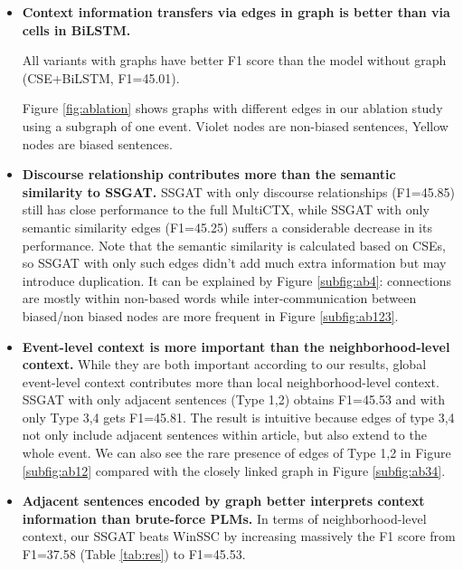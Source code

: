 \begin{itemize}
    \item \textbf{Context information transfers via edges in graph is better than via cells in BiLSTM. }
    
    All variants with graphs have better F1 score than the model without graph (CSE+BiLSTM, F1=45.01). 
    
    Figure \ref{fig:ablation} shows graphs with different edges in our ablation study using a subgraph of one event. {Violet nodes} are non-biased sentences, {Yellow nodes} are biased sentences.
    
    \item \textbf{Discourse relationship contributes more than the semantic similarity to SSGAT.} SSGAT with only discourse relationships (F1=45.85) still has close performance to the full MultiCTX, while SSGAT with only semantic similarity edges (F1=45.25) suffers a considerable decrease in its performance. Note that the semantic similarity is calculated based on CSEs, so SSGAT with only such edges didn't add much extra information but may introduce duplication. It can be explained by Figure \ref{subfig:ab4}: connections are mostly within non-based words while inter-communication between biased/non biased nodes are more frequent in Figure \ref{subfig:ab123}.
    
    

    \item \textbf{Event-level context is more important than the neighborhood-level context.} While they are both important according to our results, global event-level context contributes more than local neighborhood-level context. SSGAT with only adjacent sentences (Type 1,2) obtains F1=45.53 and with only Type 3,4 gets F1=45.81. The result is intuitive because edges of type 3,4 not only include adjacent sentences within article, but also extend to the whole event. We can also see the rare presence of edges of Type 1,2 in Figure \ref{subfig:ab12} compared with the closely linked graph in Figure  \ref{subfig:ab34}.

    \item \textbf{Adjacent sentences encoded by graph better interprets context information than brute-force PLMs.} In terms of neighborhood-level context, our SSGAT beats WinSSC by increasing massively the F1 score from F1=37.58 (Table \ref{tab:res}) to F1=45.53. 
    

\end{itemize}
